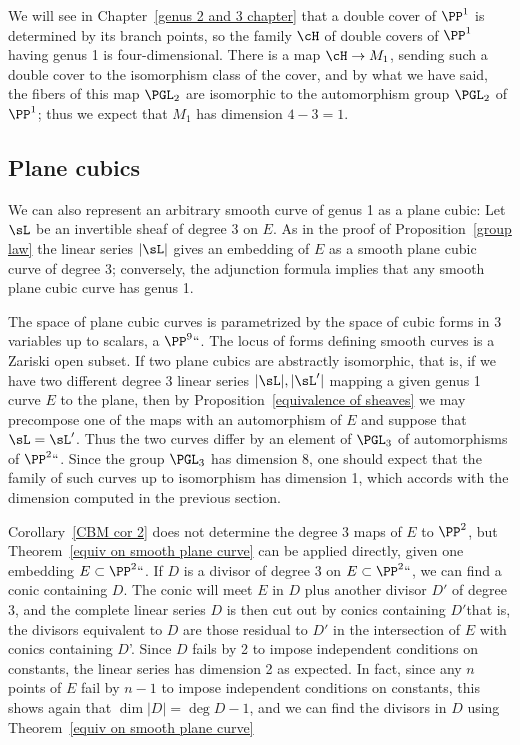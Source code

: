 
We will see in Chapter~\ref{genus 2 and 3 chapter} that a double cover
of $\PP^1$ is determined by  its branch points, so the family $\cH$ of
double covers of $\PP^1$ having genus 1 is four-dimensional. There is
a map $\cH \to M_1$, sending such a double cover to the isomorphism
class of the cover, and by what we have said, the fibers of this map
%
$\PGL_2$
%
are isomorphic to the automorphism group $\PGL_2$ of $\PP^1$; thus
we expect that $M_1$ has dimension $4-3=1$.

\subsection*{Plane cubics}

We can also represent an arbitrary smooth curve of genus 1 as a plane cubic:
%
Let $\sL$ be an invertible sheaf of degree 3 on $E$. As in the proof
of Proposition~\ref{group law} the linear series $|\sL|$ gives an
embedding of $E$ as a smooth plane cubic curve of degree 3;
conversely, the
adjunction formula
%
implies that any smooth plane cubic curve has genus 1.

The space of plane cubic curves is parametrized by the space of
cubic forms
%
in 3 variables up to
scalars, a  $\PP^9` `$. The locus of forms defining smooth curves is a Zariski open subset. If two plane cubics are abstractly
isomorphic, that is, if we have two different degree 3 linear series
$|\sL|, |\sL'|$ mapping a given genus 1 curve $E$ to the plane, then by
Proposition~\ref{equivalence of sheaves} we may  precompose one of the maps with an automorphism of $E$
and suppose that $\sL = \sL'$. Thus the two curves differ by an
element of
$\PGL_3$
%
of automorphisms of $\PP^2` `$. Since the group
$\PGL_3$ has dimension 8, one should expect that the family of such
curves up to isomorphism has dimension 1, which accords with the
dimension computed in the previous section.

Corollary~\ref{CBM cor 2} does not determine the degree 3 maps of $E$ to $\PP^{2}$, but Theorem~\ref{equiv on smooth plane curve} can be applied directly, given one embedding $E\subset \PP^2` `$. If $D$ is a divisor of degree 3 on $E\subset \PP^2` `$, we can
find a conic containing $D$. The conic will meet $E$ in $D$ plus another divisor $D'$ of degree 3, and the complete linear series
$D$ is then cut out by conics containing $D'$\emdash  that is, the divisors equivalent to $D$ are those residual to $D'$ in the intersection
of $E$ with conics containing $D$'. Since $D$ fails by 2 to impose independent conditions on constants, the linear series has dimension 2 as expected. In fact, since any $n$ points of $E$ fail by $n-1$ to impose independent conditions on constants, this shows again
that $\dim |D| = \deg D -1$, and we can find the divisors in $D$ using Theorem~\ref{equiv on smooth plane curve}

